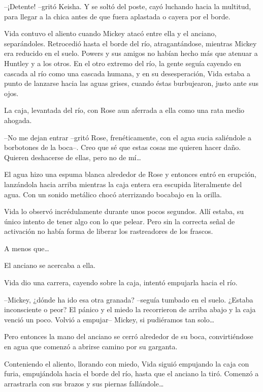 {--¡Detente! --gritó Keisha. Y se soltó del poste, cayó luchando hacia
 la multitud, para llegar a la chica antes de que fuera aplastada o
cayera por el borde.}

\mbox{}

{Vida contuvo el aliento cuando Mickey atacó entre ella y el anciano,
 separándoles. Retrocedió hasta el borde del río, atragantándose,
 mientras Mickey era reducido en el suelo. Powers y sus amigos no habían
 hecho más que atenuar a Huntley y a los otros. En el otro extremo del
 río, la gente seguía cayendo en cascada al río como una cascada humana,
 y en su desesperación, Vida estaba a punto de lanzarse hacia las aguas
grises, cuando éstas burbujearon, justo ante sus ojos.}

{La caja, levantada del río, con Rose aun aferrada a ella como una rata
medio ahogada.}

{--No me dejan entrar --gritó Rose, frenéticamente, con el agua sucia
 saliéndole a borbotones de la boca--. Creo que sé que estas cosas me
 quieren hacer daño. Quieren deshacerse de ellas, pero no de mí\ldots{}}

{El agua hizo una espuma blanca alrededor de Rose y entonces entró en
 erupción, lanzándola hacia arriba mientras la caja entera era escupida
 literalmente del agua. Con un sonido metálico chocó aterrizando bocabajo
en la orilla.}

{Vida lo observó incrédulamente durante unos pocos segundos. Allí
 estaba, su único intento de tener algo con lo que pelear. Pero sin la
 correcta señal de activación no había forma de liberar los rastreadores
de los frascos.}

{A menos que\ldots{}}

{El anciano se acercaba a ella.}

{Vida dio una carrera, cayendo sobre la caja, intentó empujarla hacia el
río.}

{--Mickey, ¿dónde ha ido esa otra granada? --seguía tumbado en el suelo.
 ¿Estaba inconsciente o peor? El pánico y el miedo la recorrieron de
 arriba abajo y la caja venció un poco. Volvió a empujar-- Mickey, si
 pudiéramos tan solo\ldots{}}

{Pero entonces la mano del anciano se cerró alrededor de su boca,
convirtiéndose en agua que comenzó a abrirse camino por su garganta.}

{Conteniendo el aliento, llorando con miedo, Vida siguió empujando la
 caja con furia, empujándola hacia el borde del río, hasta que el anciano
 la tiró. Comenzó a arrastrarla con sus brazos y sus piernas
 fallándole\ldots{}}

